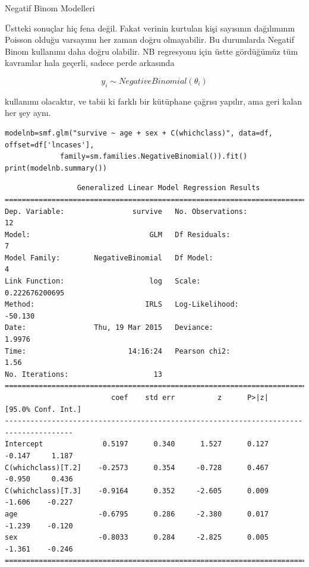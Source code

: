 \documentclass[12pt,fleqn]{article}\usepackage{../../common}
\begin{document}
Negatif Binom Modelleri 

Üstteki sonuçlar hiç fena değil. Fakat verinin kurtulan kişi sayısının
dağılımının Poisson olduğu varsayımı her zaman doğru olmayabilir. Bu
durumlarda Negatif Binom kullanımı daha doğru olabilir. NB regresyonu için
üstte gördüğümüz tüm kavramlar hala geçerli, sadece perde arkasında

$$ y_i \sim NegativeBinomial(\theta_i) $$

kullanımı olacaktır, ve tabii ki farklı bir kütüphane çağrısı yapılır,
ama geri kalan her şey aynı. 

\begin{verbatim}
modelnb=smf.glm("survive ~ age + sex + C(whichclass)", data=df, offset=df['lncases'],
             family=sm.families.NegativeBinomial()).fit()
print(modelnb.summary())
\end{verbatim}

\begin{verbatim}
                 Generalized Linear Model Regression Results                  
==============================================================================
Dep. Variable:                survive   No. Observations:                   12
Model:                            GLM   Df Residuals:                        7
Model Family:        NegativeBinomial   Df Model:                            4
Link Function:                    log   Scale:                  0.222676200695
Method:                          IRLS   Log-Likelihood:                -50.130
Date:                Thu, 19 Mar 2015   Deviance:                       1.9976
Time:                        14:16:24   Pearson chi2:                     1.56
No. Iterations:                    13                                         
======================================================================================
                         coef    std err          z      P>|z|      [95.0% Conf. Int.]
--------------------------------------------------------------------------------------
Intercept              0.5197      0.340      1.527      0.127        -0.147     1.187
C(whichclass)[T.2]    -0.2573      0.354     -0.728      0.467        -0.950     0.436
C(whichclass)[T.3]    -0.9164      0.352     -2.605      0.009        -1.606    -0.227
age                   -0.6795      0.286     -2.380      0.017        -1.239    -0.120
sex                   -0.8033      0.284     -2.825      0.005        -1.361    -0.246
======================================================================================
\end{verbatim}
\end{document}
